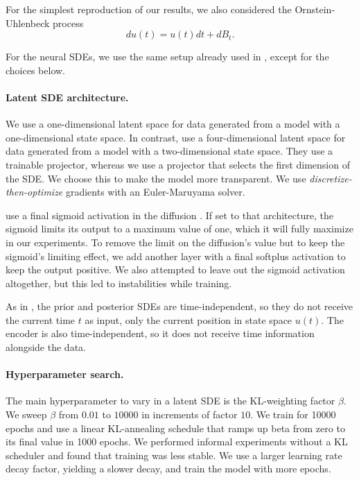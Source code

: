 \documentclass[twoside,11pt]{article}
\begin{document}
For the simplest reproduction of our results, we also considered the Ornstein-Uhlenbeck process
\[
    du(t) = u(t) dt + d B_t.
\]

For the neural SDEs, we use the same setup already used in \cite{li2020scalable}, except for the choices below.

\paragraph{Latent SDE architecture.}
We use a one-dimensional latent space for data generated from a model with a one-dimensional state space. In contrast, \cite{li2020scalable} use a four-dimensional latent space for data generated from a model with a two-dimensional state space. They use a trainable projector, whereas we use a projector that selects the first dimension of the SDE. We choose this to make the model more transparent. We use \textit{discretize-then-optimize} gradients \cite[][cf.]{kidgerefficient} with an Euler-Maruyama solver.

\citeauthor{li2020scalable} use a final sigmoid activation in the diffusion \cite{li2020scalable}. If set to that architecture, the sigmoid limits its output to a maximum value of one, which it will fully maximize in our experiments. To remove the limit on the diffusion's value but to keep the sigmoid's limiting effect, we add another layer with a final softplus activation to keep the output positive. We also attempted to leave out the sigmoid activation altogether, but this led to instabilities while training.

As in \cite{li2020scalable}, the prior and posterior SDEs are time-independent, so they do not receive the current time \(t\) as input, only the current position in state space \(u(t)\). The encoder is also time-independent, so it does not receive time information alongside the data.

\paragraph{Hyperparameter search.}
The main hyperparameter to vary in a latent SDE is the KL-weighting factor \(\beta\). We sweep \(\beta\) from \(0.01\) to \(10000\) in increments of factor \(10\). We train for 10000 epochs and use a linear KL-annealing schedule \citep{fu2019cyclical} that ramps up beta from zero to its final value in 1000 epochs. We performed informal experiments without a KL scheduler and found that training was less stable. We use a larger learning rate decay factor, yielding a slower decay, and train the model with more epochs.
\end{document}
